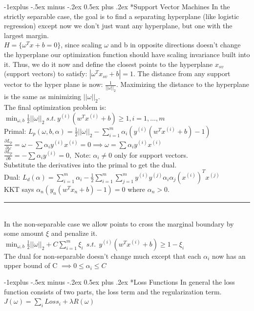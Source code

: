 \documentclass[3pt,landscape]{article}
\makeatletter
\renewcommand{\subsection}{\@startsection{subsection}{2}{0mm}%
                            {-1explus -.5ex minus -.2ex}%
                            {0.5ex plus .2ex}%
                            {\normalfont\normalsize\bfseries}}
\makeatother
\begin{document}
\begin{multicols}{3}
\subsection*{Support Vector Machines}
In the strictly separable case, the goal is to find a separating hyperplane (like logistic regression) except now we don't just want any hyperplane, but one with the largest margin. \\
$H=\{\omega^Tx+b=0\}$, since scaling $\omega$ and b in opposite directions doesn't change the hyperplane our optimization function should have scaling invariance built into it. Thus, we do it now and define the closest points to the hyperplane $x_{sv}$ (support vectors) to satisfy: $|\omega^Tx_{sv}+b|=1$. The distance from any support vector to the hyper plane is now: $\frac{1}{||\omega||_2}$. Maximizing the distance to the hyperplane is the same as minimizing $||\omega||_2$.\\
The final optimization problem is: $\boxed{\min_{\omega,b} \frac{1}{2}||\omega||_2\ s.t.\ y^{(i)}(w^Tx^{(i)}+b)\ge1, i=1,\dots,m}$\\
Primal: $L_p(\omega,b,\alpha)=\frac{1}{2}||\omega||_2-\sum_{i=1}^m\alpha_i(y^{(i)}(w^Tx^{(i)}+b)-1)$\\
$\frac{\partial L_p}{\partial\omega}=\omega-\sum \alpha_iy^{(i)}x^{(i)}=0 \implies \omega=\sum \alpha_iy^{(i)}x^{(i)}$\\
$\frac{\partial L_p}{\partial b}=-\sum \alpha_iy^{(i)}=0, \text{\ \ \ Note: }\alpha_i\ne 0$ only for support vectors.\\
Substitute the derivatives into the primal to get the dual.\\
Dual: $L_d(\alpha)=\sum_{i=1}^m\alpha_i-\frac{1}{2}\sum_{i=1}^m\sum_{j=1}^my^{(i)}y^{(j)}\alpha_i\alpha_j(x^{(i)})^Tx^{(j)}$\\
KKT says $\alpha_n (y_n (w^T x_n + b) - 1) = 0$ where $\alpha_n > 0$.
\rule{1\linewidth}{0.1pt}\\
In the non-separable case we allow points to cross the marginal boundary by some amount $\xi$ and penalize it.\\
$\boxed{\min_{\omega,b} \frac{1}{2}||\omega||_2+C\sum_{i=1}^m\xi_i\ \ s.t.\ \ y^{(i)}(w^Tx^{(i)}+b)\ge1-\xi_i}$\\
The dual for non-separable doesn't change much except that each $\alpha_i$ now has an upper bound of C $\implies 0\le\alpha_i\le C$

\subsection*{Loss Functions}
In general the loss function consists of two parts, the loss term and the regularization term. $J(\omega)=\sum_i Loss_i + \lambda R(\omega)$


\end{multicols}
\end{document}
